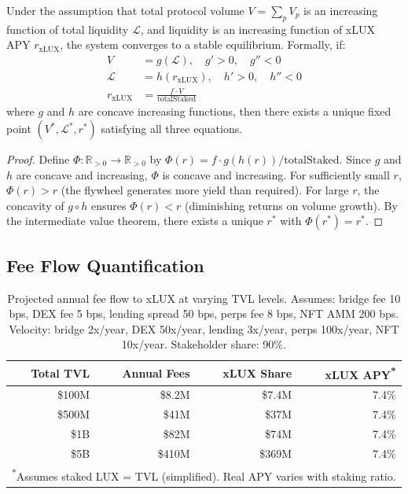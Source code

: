 \begin{theorem}\label{thm:flywheel}
Under the assumption that total protocol volume $V = \sum_p V_p$ is an increasing function of total liquidity $\mathcal{L}$, and liquidity is an increasing function of xLUX APY $r_{\text{xLUX}}$, the system converges to a stable equilibrium. Formally, if:
\begin{align}
  V &= g(\mathcal{L}), \quad g' > 0, \quad g'' < 0 \label{eq:fly1} \\
  \mathcal{L} &= h(r_{\text{xLUX}}), \quad h' > 0, \quad h'' < 0 \label{eq:fly2} \\
  r_{\text{xLUX}} &= \frac{f \cdot V}{\text{totalStaked}} \label{eq:fly3}
\end{align}
where $g$ and $h$ are concave increasing functions, then there exists a unique fixed point $(V^*, \mathcal{L}^*, r^*)$ satisfying all three equations.
\end{theorem}

\begin{proof}
Define $\Phi: \mathbb{R}_{>0} \to \mathbb{R}_{>0}$ by $\Phi(r) = f \cdot g(h(r)) / \text{totalStaked}$. Since $g$ and $h$ are concave and increasing, $\Phi$ is concave and increasing. For sufficiently small $r$, $\Phi(r) > r$ (the flywheel generates more yield than required). For large $r$, the concavity of $g \circ h$ ensures $\Phi(r) < r$ (diminishing returns on volume growth). By the intermediate value theorem, there exists a unique $r^*$ with $\Phi(r^*) = r^*$.
\end{proof}

\subsection{Fee Flow Quantification}

\begin{table}[h]
\centering
\small
\caption{Projected annual fee flow to xLUX at varying TVL levels. Assumes: bridge fee 10 bps, DEX fee 5 bps, lending spread 50 bps, perps fee 8 bps, NFT AMM 200 bps. Velocity: bridge 2x/year, DEX 50x/year, lending 3x/year, perps 100x/year, NFT 10x/year. Stakeholder share: 90\%.}
\label{tab:fee_flow}
\begin{tabular}{@{}rrrr@{}}
\toprule
\textbf{Total TVL} & \textbf{Annual Fees} & \textbf{xLUX Share} & \textbf{xLUX APY\textsuperscript{*}} \\
\midrule
\$100M & \$8.2M & \$7.4M & 7.4\% \\
\$500M & \$41M & \$37M & 7.4\% \\
\$1B & \$82M & \$74M & 7.4\% \\
\$5B & \$410M & \$369M & 7.4\% \\
\bottomrule
\multicolumn{4}{l}{\textsuperscript{*}\scriptsize Assumes staked LUX = TVL (simplified). Real APY varies with staking ratio.}
\end{tabular}
\end{table}

